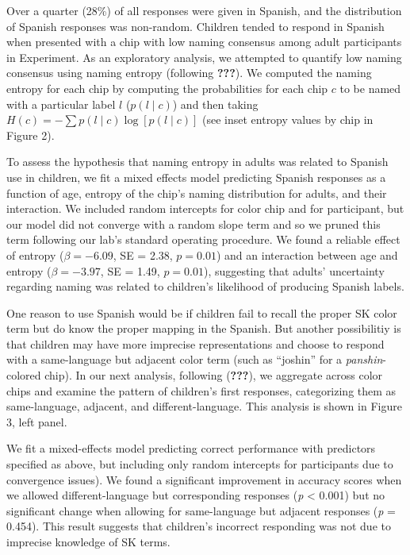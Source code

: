 \documentclass[,man,floatsintext]{apa6}
\theoremstyle{definition}
\theoremstyle{definition}
\theoremstyle{definition}
\theoremstyle{remark}
\begin{document}
Over a quarter (28\%) of all responses were given in Spanish, and the
distribution of Spanish responses was non-random. Children tended to
respond in Spanish when presented with a chip with low naming consensus
among adult participants in Experiment. As an exploratory analysis, we
attempted to quantify low naming consensus using naming entropy
(following {\textbf{???}}). We computed the naming entropy for each chip
by computing the probabilities for each chip \(c\) to be named with a
particular label \(l\) (\(p(l \mid c)\)) and then taking
\(H(c) = - \sum{p(l\mid c) \log[p(l \mid c)]}\) (see inset entropy
values by chip in Figure 2).

To assess the hypothesis that naming entropy in adults was related to
Spanish use in children, we fit a mixed effects model predicting Spanish
responses as a function of age, entropy of the chip's naming
distribution for adults, and their interaction. We included random
intercepts for color chip and for participant, but our model did not
converge with a random slope term and so we pruned this term following
our lab's standard operating procedure. We found a reliable effect of
entropy (\(\beta = -6.09\), SE = 2.38, \(p = 0.01\)) and an interaction
between age and entropy (\(\beta = -3.97\), SE = 1.49, \(p = 0.01\)),
suggesting that adults' uncertainty regarding naming was related to
children's likelihood of producing Spanish labels.

One reason to use Spanish would be if children fail to recall the proper
SK color term but do know the proper mapping in the Spanish. But another
possibilitiy is that children may have more imprecise representations
and choose to respond with a same-language but adjacent color term (such
as \enquote{joshin} for a \emph{panshin}-colored chip). In our next
analysis, following ({\textbf{???}}), we aggregate across color chips
and examine the pattern of children's first responses, categorizing them
as same-language, adjacent, and different-language. This analysis is
shown in Figure 3, left panel.

We fit a mixed-effects model predicting correct performance with
predictors specified as above, but including only random intercepts for
participants due to convergence issues). We found a significant
improvement in accuracy scores when we allowed different-language but
corresponding responses (\emph{p} \textless{} 0.001) but no significant
change when allowing for same-language but adjacent responses (\emph{p}
= 0.454). This result suggests that children's incorrect responding was
not due to imprecise knowledge of SK terms.
\end{document}

